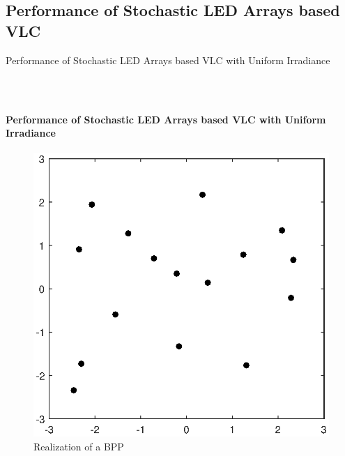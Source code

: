 \documentclass[slidestop,usepdftitle=false]{gvvslides}
\begin{document}
\subsection{Performance of Stochastic LED Arrays based VLC}
\begin{frame}
\vfill
Performance of Stochastic LED Arrays based VLC with Uniform Irradiance
\vfill
\end{frame}
\begin{frame}
\frametitle{\,}
\framesubtitle{Performance of Stochastic LED Arrays based VLC with Uniform Irradiance}
   \begin{figure}
        \centering
        \includegraphics[width=.6\framewidth]{LedArrangementRandom}
        \caption{Realization of a BPP}
        \end{figure}
\end{frame}
\end{document}
